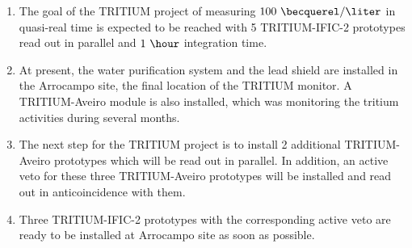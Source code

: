 \begin{enumerate}
\item{} The goal of the TRITIUM project of measuring $100~\becquerel/\liter$ in quasi-real time is expected to be reached with 5 TRITIUM-IFIC-2 prototypes read out in parallel and $1~\hour$ integration time.

\item{} At present, the water purification system and the lead shield are installed in the Arrocampo site, the final location of the TRITIUM monitor. A TRITIUM-Aveiro module is also installed, which was monitoring the tritium activities during several months. 

\item{} The next step for the TRITIUM project is to install 2 additional TRITIUM-Aveiro prototypes which will be read out in parallel. In addition, an active veto for these three TRITIUM-Aveiro prototypes will be installed and read out in anticoincidence with them. 

\item{} Three TRITIUM-IFIC-2 prototypes with the corresponding active veto are ready to be installed at Arrocampo site as soon as possible.


\end{enumerate}

